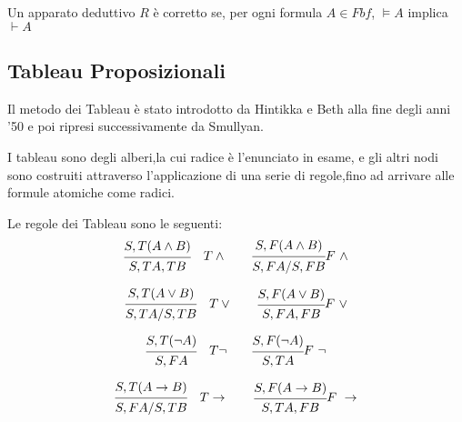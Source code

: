 \begin{thm}
    Un apparato deduttivo $R$ è corretto se, per ogni formula $A \in Fbf$, $\models A$
    implica $\vdash A$
\end{thm}
\subsection{Tableau Proposizionali}
Il metodo dei Tableau è stato introdotto da Hintikka e Beth alla fine degli anni '50
e poi ripresi successivamente da Smullyan.

I tableau sono degli alberi,la cui radice è l'enunciato in esame, e gli altri nodi
sono costruiti attraverso l'applicazione di una serie di regole,fino ad arrivare
alle formule atomiche come radici.

Le regole dei Tableau sono le seguenti:
\begin{equation*}
\begin{prooftree}
\hypo{S,T (A \land B)}
\infer1 {S,TA,TB}
\end{prooftree}
\quad T \land \qquad
\begin{prooftree}
\hypo{S,F (A \land B)}
\infer1 {S,FA/S,FB}
\end{prooftree}
F \ \land
\end{equation*}

\begin{equation*}
\begin{prooftree}
\hypo{S,T (A \lor B)}
\infer1 {S,TA / S,TB}
\end{prooftree}
\quad T \lor \qquad
\begin{prooftree}
\hypo{S,F (A \lor B)}
\infer1 {S,FA,FB}
\end{prooftree}
F \ \lor
\end{equation*}

\begin{equation*}
\begin{prooftree}
\hypo{S,T (\neg A)}
\infer1 {S,FA}
\end{prooftree}
\quad T \neg \qquad
\begin{prooftree}
\hypo{S,F (\neg A)}
\infer1 {S,TA}
\end{prooftree}
F \ \neg
\end{equation*}

\begin{equation*}
\begin{prooftree}
\hypo{S,T (A \rightarrow B)}
\infer1 {S,FA / S,TB}
\end{prooftree}
\quad T \rightarrow \qquad
\begin{prooftree}
\hypo{S,F (A \rightarrow B)}
\infer1 {S,TA,FB}
\end{prooftree}
F \ \rightarrow
\end{equation*}

